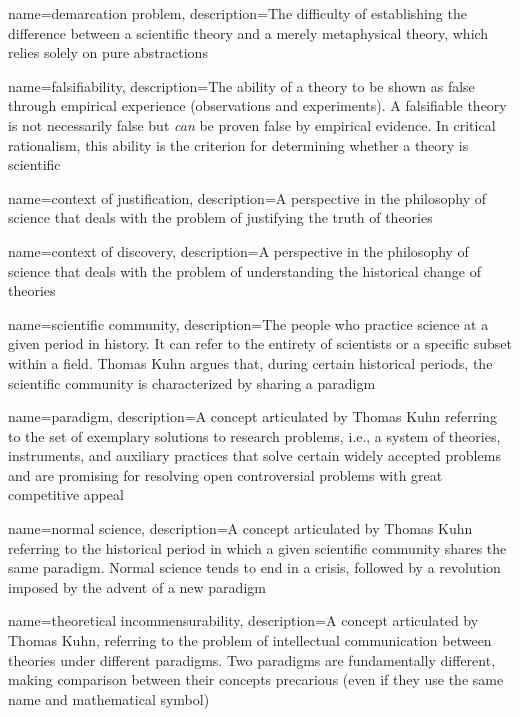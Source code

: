 {
    name=demarcation problem,
    description={The difficulty of establishing the difference between a scientific theory and a merely metaphysical theory, which relies solely on pure abstractions}
}

{
    name=falsifiability,
    description={The ability of a theory to be shown as false through empirical experience (observations and experiments). A falsifiable theory is not necessarily false but \textit{can} be proven false by empirical evidence. In critical rationalism, this ability is the criterion for determining whether a theory is scientific}
}

{
    name=context of justification,
    description={A perspective in the philosophy of science that deals with the problem of justifying the truth of theories}
}

{
    name=context of discovery,
    description={A perspective in the philosophy of science that deals with the problem of understanding the historical change of theories}
}

{
    name=scientific community,
    description={The people who practice science at a given period in history. It can refer to the entirety of scientists or a specific subset within a field. Thomas Kuhn argues that, during certain historical periods, the scientific community is characterized by sharing a paradigm}
}

{
    name=paradigm,
    description={A concept articulated by Thomas Kuhn referring to the set of exemplary solutions to research problems, i.e., a system of theories, instruments, and auxiliary practices that solve certain widely accepted problems and are promising for resolving open controversial problems with great competitive appeal}
}

{
    name=normal science,
    description={A concept articulated by Thomas Kuhn referring to the historical period in which a given scientific community shares the same paradigm. Normal science tends to end in a crisis, followed by a revolution imposed by the advent of a new paradigm}
}

{
    name=theoretical incommensurability,
    description={A concept articulated by Thomas Kuhn, referring to the problem of intellectual communication between theories under different paradigms. Two paradigms are fundamentally different, making comparison between their concepts precarious (even if they use the same name and mathematical symbol)}
}

